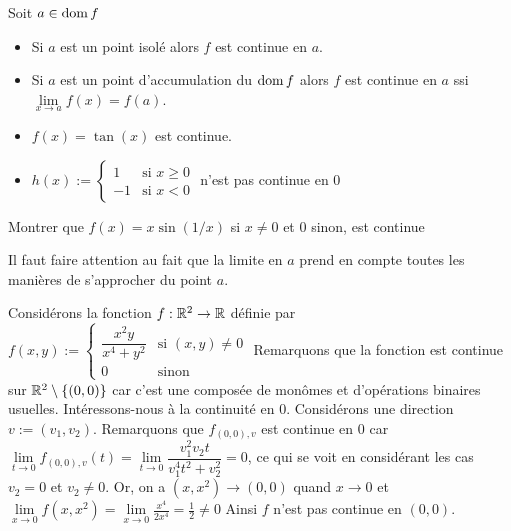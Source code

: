     \begin{remarque}
        Soit $a\in \operatorname{dom} f$
        \begin{itemize}
            \item Si $a$ est un point isolé alors $f$ est continue en $a$.
            \item Si $a$ est un point d'accumulation du $\operatorname{dom} f$ alors $f$ est continue en $a$ ssi $\lim\limits_{x\to a}f(x)=f(a)$.
        \end{itemize}
    \end{remarque}
    \begin{exemple}
        \begin{itemize}    
            \item $f(x) = \tan(x)$ est continue.
            \item $h(x):=\begin{cases}
                1 &\text{si } x\geq 0\\
                -1 &\text{si } x<0
            \end{cases}$  n'est pas continue en 0 %
        \end{itemize}
    \end{exemple}
     \begin{exercice}
        Montrer que $f(x)=x\sin(1/x)$ si $x\neq 0$ et $0$ sinon, est continue
     \end{exercice}
     Il faut faire attention au fait que la limite en $a$ prend en compte toutes les manières de s'approcher du point $a$.
     \begin{exemple}
         Considérons la fonction $f:\mathbb{R}^2\to\mathbb{R}$ définie par $f(x,y):=\begin{cases}
                \dfrac{x^2y}{x^4+y^2} &\text{si } (x,y)\ne 0\\
                0 &\text{sinon} 
            \end{cases}$
        Remarquons que la fonction est continue sur $\mathbb{R}^2\setminus\{(0,0)\}$ car c'est une composée de monômes et d'opérations binaires usuelles.
        Intéressons-nous à la continuité en $0$.
        Considérons une direction $v:=(v_1,v_2)$.
        Remarquons que $f_{(0,0),v}$ est continue en $0$ car $\lim\limits_{t\to 0}f_{(0,0),v}(t) = \lim\limits_{t\to 0}\dfrac{v_1^2v_2t}{v_1^4t^2+v_2^2}=0$, ce qui se voit en considérant les cas $v_2=0$ et $v_2\ne 0$.
        Or, on a $(x,x^2)\to (0,0)$ quand $x\to 0$ et $ \lim\limits_{x\to 0}f(x,x^2)=\lim\limits_{x\to 0}\frac{x^4}{2x^4} = \frac 1 2\ne0$
        Ainsi $f$ n'est pas continue en $(0,0)$.   
     \end{exemple}
